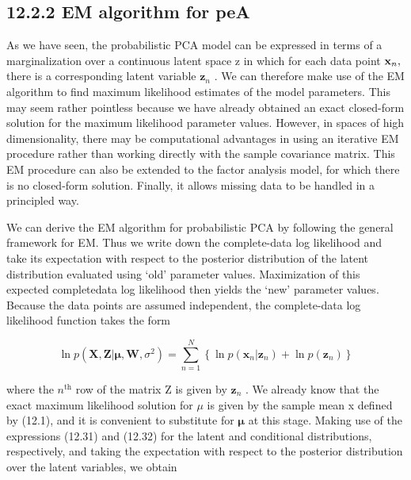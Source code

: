 \documentclass[
  10
]{article}
\begin{document}
\subsection{12.2.2 EM algorithm for peA}\label{em-algorithm-for-pea}

As we have seen, the probabilistic PCA model can be expressed in terms
of a marginalization over a continuous latent space z in which for each
data point \({ \bf x } _ { n } ,\) there is a corresponding latent
variable \(\mathbf { z } _ { n }\) . We can therefore make use of the EM
algorithm to find maximum likelihood estimates of the model parameters.
This may seem rather pointless because we have already obtained an exact
closed-form solution for the maximum likelihood parameter values.
However, in spaces of high dimensionality, there may be computational
advantages in using an iterative EM procedure rather than working
directly with the sample covariance matrix. This EM procedure can also
be extended to the factor analysis model, for which there is no
closed-form solution. Finally, it allows missing data to be handled in a
principled way.

We can derive the EM algorithm for probabilistic PCA by following the
general framework for EM. Thus we write down the complete-data log
likelihood and take its expectation with respect to the posterior
distribution of the latent distribution evaluated using `old' parameter
values. Maximization of this expected completedata log likelihood then
yields the `new' parameter values. Because the data points are assumed
independent, the complete-data log likelihood function takes the form

\[
\ln p \left(\mathbf {X}, \mathbf {Z} | \pmb {\mu}, \mathbf {W}, \sigma^ {2}\right) = \sum_ {n = 1} ^ {N} \left\{\ln p (\mathbf {x} _ {n} | \mathbf {z} _ {n}) + \ln p (\mathbf {z} _ {n}) \right\}\tag{12.52}
\]

where the \(n ^ { \mathrm { t h } }\) row of the matrix Z is given by
\(\mathbf { z } _ { n }\) . We already know that the exact maximum
likelihood solution for \(\mu\) is given by the sample mean x defined by
(12.1), and it is convenient to substitute for \(\pmb { \mu }\) at this
stage. Making use of the expressions (12.31) and (12.32) for the latent
and conditional distributions, respectively, and taking the expectation
with respect to the posterior distribution over the latent variables, we
obtain
\end{document}

